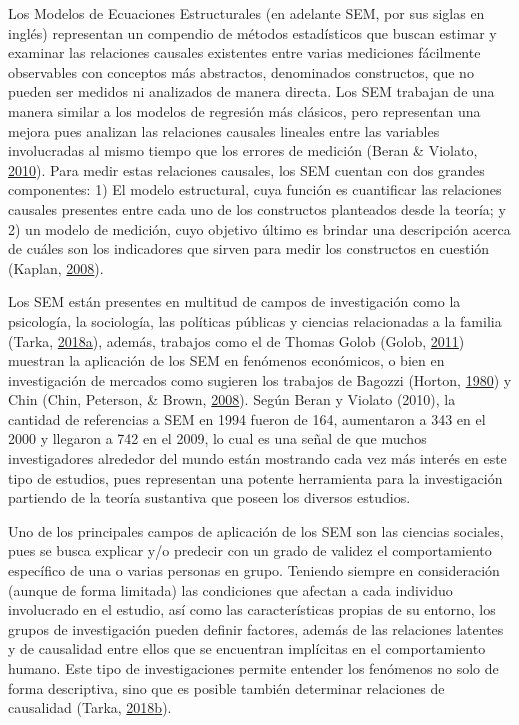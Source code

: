 \documentclass[
  english]{revcoles}
\begin{document}
Los Modelos de Ecuaciones Estructurales (en adelante SEM, por sus siglas
en inglés) representan un compendio de métodos estadísticos que buscan
estimar y examinar las relaciones causales existentes entre varias
mediciones fácilmente observables con conceptos más abstractos,
denominados constructos, que no pueden ser medidos ni analizados de
manera directa. Los SEM trabajan de una manera similar a los modelos de
regresión más clásicos, pero representan una mejora pues analizan las
relaciones causales lineales entre las variables involucradas al mismo
tiempo que los errores de medición (Beran \& Violato,
\protect\hyperlink{ref-Beran2010StructuralEM}{2010}). Para medir estas
relaciones causales, los SEM cuentan con dos grandes componentes: 1) El
modelo estructural, cuya función es cuantificar las relaciones causales
presentes entre cada uno de los constructos planteados desde la teoría;
y 2) un modelo de medición, cuyo objetivo último es brindar una
descripción acerca de cuáles son los indicadores que sirven para medir
los constructos en cuestión (Kaplan,
\protect\hyperlink{ref-kaplan}{2008}).

Los SEM están presentes en multitud de campos de investigación como la
psicología, la sociología, las políticas públicas y ciencias
relacionadas a la familia (Tarka,
\protect\hyperlink{ref-tarka}{2018}\protect\hyperlink{ref-tarka}{a}),
además, trabajos como el de Thomas Golob (Golob,
\protect\hyperlink{ref-golob}{2011}) muestran la aplicación de los SEM
en fenómenos económicos, o bien en investigación de mercados como
sugieren los trabajos de Bagozzi (Horton,
\protect\hyperlink{ref-bagozzi}{1980}) y Chin (Chin, Peterson, \& Brown,
\protect\hyperlink{ref-chin}{2008}). Según Beran y Violato (2010), la
cantidad de referencias a SEM en 1994 fueron de 164, aumentaron a 343 en
el 2000 y llegaron a 742 en el 2009, lo cual es una señal de que muchos
investigadores alrededor del mundo están mostrando cada vez más interés
en este tipo de estudios, pues representan una potente herramienta para
la investigación partiendo de la teoría sustantiva que poseen los
diversos estudios.

Uno de los principales campos de aplicación de los SEM son las ciencias
sociales, pues se busca explicar y/o predecir con un grado de validez el
comportamiento específico de una o varias personas en grupo. Teniendo
siempre en consideración (aunque de forma limitada) las condiciones que
afectan a cada individuo involucrado en el estudio, así como las
características propias de su entorno, los grupos de investigación
pueden definir factores, además de las relaciones latentes y de
causalidad entre ellos que se encuentran implícitas en el comportamiento
humano. Este tipo de investigaciones permite entender los fenómenos no
solo de forma descriptiva, sino que es posible también determinar
relaciones de causalidad (Tarka,
\protect\hyperlink{ref-Tarka}{2018}\protect\hyperlink{ref-Tarka}{b}).
\end{document}
